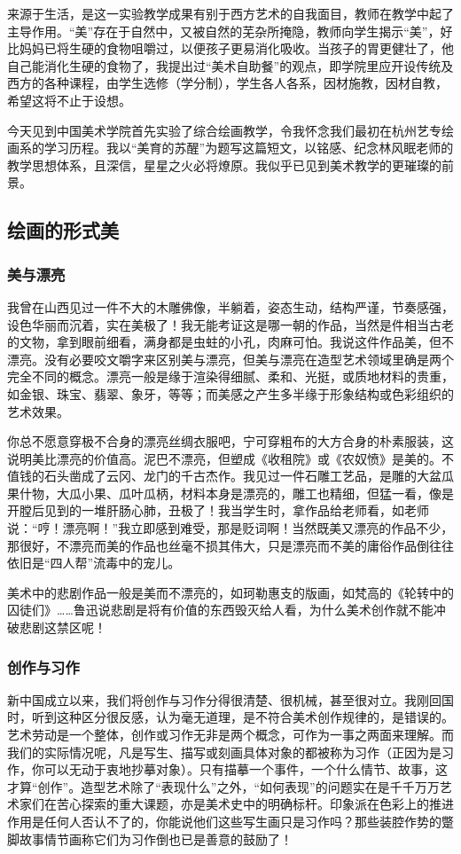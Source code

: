 \documentclass{article}
\begin{document}
来源于生活，是这一实验教学成果有别于西方艺术的自我面目，教师在教学中起了主导作用。“美”存在于自然中，又被自然的芜杂所掩隐，教师向学生揭示“美”，好比妈妈已将生硬的食物咀嚼过，以便孩子更易消化吸收。当孩子的胃更健壮了，他自己能消化生硬的食物了，我提出过“美术自助餐”的观点，即学院里应开设传统及西方的各种课程，由学生选修（学分制），学生各人各系，因材施教，因材自教，希望这将不止于设想。

今天见到中国美术学院首先实验了综合绘画教学，令我怀念我们最初在杭州艺专绘画系的学习历程。我以“美育的苏醒”为题写这篇短文，以铭感、纪念林风眠老师的教学思想体系，且深信，星星之火必将燎原。我似乎已见到美术教学的更璀璨的前景。
\subsection{绘画的形式美}
\subsubsection{美与漂亮}
我曾在山西见过一件不大的木雕佛像，半躺着，姿态生动，结构严谨，节奏感强，设色华丽而沉着，实在美极了！我无能考证这是哪一朝的作品，当然是件相当古老的文物，拿到眼前细看，满身都是虫蛀的小孔，肉麻可怕。我说这件作品美，但不漂亮。没有必要咬文嚼字来区别美与漂亮，但美与漂亮在造型艺术领域里确是两个完全不同的概念。漂亮一般是缘于渲染得细腻、柔和、光挺，或质地材料的贵重，如金银、珠宝、翡翠、象牙，等等；而美感之产生多半缘于形象结构或色彩组织的艺术效果。

你总不愿意穿极不合身的漂亮丝绸衣服吧，宁可穿粗布的大方合身的朴素服装，这说明美比漂亮的价值高。泥巴不漂亮，但塑成《收租院》或《农奴愤》是美的。不值钱的石头凿成了云冈、龙门的千古杰作。我见过一件石雕工艺品，是雕的大盆瓜果什物，大瓜小果、瓜叶瓜柄，材料本身是漂亮的，雕工也精细，但猛一看，像是开膛后见到的一堆肝肠心肺，丑极了！我当学生时，拿作品给老师看，如老师说：“哼！漂亮啊！”我立即感到难受，那是贬词啊！当然既美又漂亮的作品不少，那很好，不漂亮而美的作品也丝毫不损其伟大，只是漂亮而不美的庸俗作品倒往往依旧是“四人帮”流毒中的宠儿。

美术中的悲剧作品一般是美而不漂亮的，如珂勒惠支的版画，如梵高的《轮转中的囚徒们》……鲁迅说悲剧是将有价值的东西毁灭给人看，为什么美术创作就不能冲破悲剧这禁区呢！
\subsubsection{创作与习作}
新中国成立以来，我们将创作与习作分得很清楚、很机械，甚至很对立。我刚回国时，听到这种区分很反感，认为毫无道理，是不符合美术创作规律的，是错误的。艺术劳动是一个整体，创作或习作无非是两个概念，可作为一事之两面来理解。而我们的实际情况呢，凡是写生、描写或刻画具体对象的都被称为习作（正因为是习作，你可以无动于衷地抄摹对象）。只有描摹一个事件，一个什么情节、故事，这才算“创作”。造型艺术除了“表现什么”之外，“如何表现”的问题实在是千千万万艺术家们在苦心探索的重大课题，亦是美术史中的明确标杆。印象派在色彩上的推进作用是任何人否认不了的，你能说他们这些写生画只是习作吗？那些装腔作势的蹩脚故事情节画称它们为习作倒也已是善意的鼓励了！
\end{document}
